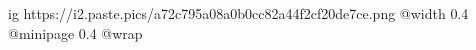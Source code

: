  
 
 
 
 

\ifcmt
  ig https://i2.paste.pics/a72c795a08a0b0cc82a44f2cf20de7ce.png
  @width 0.4
  @minipage 0.4
  @wrap \parpic[r]
\fi
